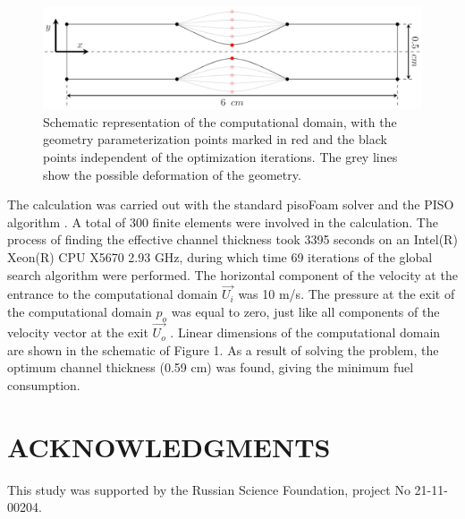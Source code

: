\documentclass{aip-cp}
\begin{document}
\begin{figure}%
\includegraphics[width=1.0\linewidth]{fig1.png}
\caption{Schematic representation of the computational domain, with the geometry parameterization points marked in red and the black points independent of the optimization iterations. The grey lines show the possible deformation of the geometry.}
\label{fig}
\end{figure}

The calculation was carried out with the standard pisoFoam solver and the PISO algorithm \cite{Issa1986_2}.
A total of 300 finite elements were involved in the calculation. The process of finding the effective channel thickness took 3395 seconds on an Intel(R) Xeon(R) CPU X5670 2.93 GHz, during which time 69 iterations of the global search algorithm were performed. The horizontal component of the velocity at the entrance to the computational domain $\vec{U_i}$  was 10 m/s. The pressure at the exit of the computational domain $p_o$ was equal to zero, just like all components of the velocity vector at the exit $\vec{U_o}$ . Linear dimensions of the computational domain are shown in the schematic of Figure 1. As a result of solving the problem, the optimum channel thickness (0.59 cm) was found, giving the minimum fuel consumption.

\section{ACKNOWLEDGMENTS}
This study was supported by the Russian Science Foundation, project No 21-11-00204.

\cite{Issa1986_1}




%
%
\end{document}
